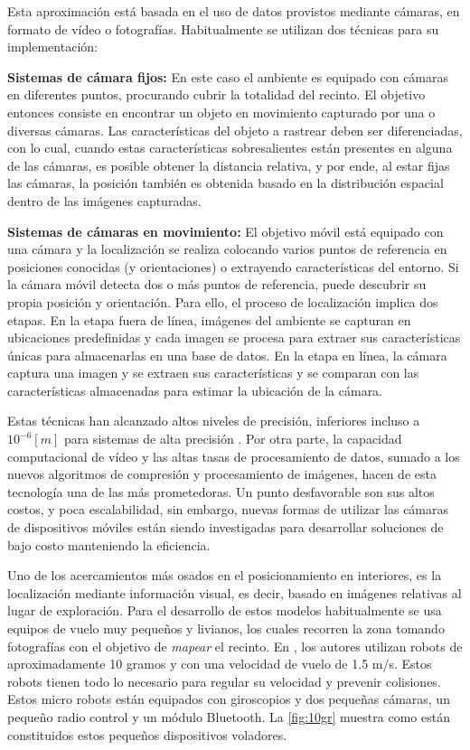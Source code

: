 Esta aproximación está basada en el uso de datos provistos mediante cámaras, en formato de vídeo o fotografías. Habitualmente se utilizan dos técnicas para su implementación:

\textbf{Sistemas de cámara fijos:} En este caso el ambiente es equipado con cámaras en diferentes puntos, procurando cubrir la totalidad del recinto. El objetivo entonces consiste en encontrar un objeto en movimiento capturado por una o diversas cámaras. Las características del objeto a rastrear deben ser diferenciadas, con lo cual, cuando estas características sobresalientes están presentes en alguna de las cámaras, es posible obtener la distancia relativa, y por ende, al estar fijas las cámaras, la posición también es obtenida basado en la distribución espacial dentro de las imágenes capturadas.

\textbf{Sistemas de cámaras en movimiento:} El objetivo móvil está equipado con una cámara y la localización se realiza colocando varios puntos de referencia en posiciones conocidas (y orientaciones) o extrayendo características del entorno. Si la cámara móvil detecta dos o más puntos de referencia, puede descubrir su propia posición y orientación. Para ello, el proceso de localización implica dos etapas. En la etapa fuera de línea, imágenes del ambiente se capturan en ubicaciones predefinidas y cada imagen se procesa para extraer sus características únicas para almacenarlas en una base de datos. En la etapa en línea, la cámara captura una imagen y se extraen sus características y se comparan con las características almacenadas para estimar la ubicación de la cámara.

Estas técnicas han alcanzado altos niveles de precisión, inferiores incluso a \(10^{-6} [m]\) para sistemas de alta precisión \citep{6071925}. Por otra parte, la capacidad computacional de vídeo y las altas tasas de procesamiento de datos, sumado a los nuevos algoritmos de compresión y procesamiento de imágenes, hacen de esta tecnología una de las más prometedoras. Un punto desfavorable son sus altos costos, y poca escalabilidad, sin embargo, nuevas formas de utilizar las cámaras de dispositivos móviles están siendo investigadas para desarrollar soluciones de bajo costo manteniendo la eficiencia.

Uno de los acercamientos más osados en el posicionamiento en interiores, es la localización mediante información visual, es decir, basado en imágenes relativas al lugar de exploración. Para el desarrollo de estos modelos habitualmente se usa equipos de vuelo muy pequeños y livianos, los cuales recorren la zona tomando fotografías con el objetivo de \textit{mapear} el recinto.  En \citep{4058367}, los autores utilizan robots de aproximadamente 10 gramos y con una velocidad de vuelo de 1.5 m/s. Estos robots tienen todo lo necesario para regular su velocidad y prevenir colisiones. Estos micro robots están equipados con giroscopios y dos pequeñas cámaras, un pequeño radio control y un módulo Bluetooth. La \autoref{fig:10gr} muestra como están constituidos estos pequeños dispositivos voladores.\\

